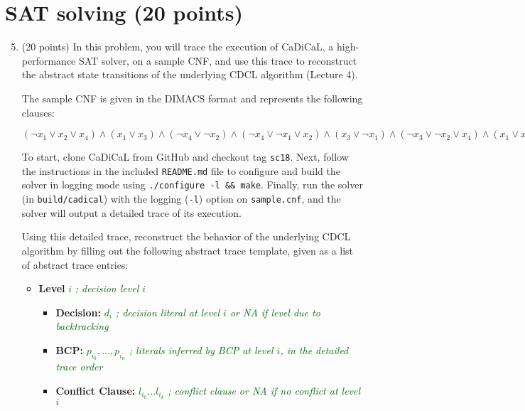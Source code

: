 \documentclass{article}
\begin{document}
\section{SAT solving (20 points)}\label{solving}


\begin{enumerate}
	\setcounter{enumi}{4}
	
	\item (20 points) In this problem, you will trace the execution of CaDiCaL, a high-performance SAT solver, on a sample CNF, and use this trace to reconstruct the abstract state transitions of the underlying CDCL algorithm (Lecture 4). 
	
	The sample CNF is given in the DIMACS format and represents the following clauses: 
	\begin{center}
		$(\neg x_1 \lor x_2 \lor x_4) \wedge (x_1 \lor x_3)  \wedge (\neg x_4 \lor \neg x_2) \wedge (\neg x_4 \lor \neg x_1 \lor x_2)  \wedge (x_3 \lor \neg x_1)  \wedge (\neg x_3 \lor \neg x_2 \lor x_4) \wedge (x_1 \lor x_4) \wedge (\neg x_2 \lor x_1)$
	\end{center}
	
	To start, clone CaDiCaL from GitHub and checkout tag \texttt{sc18}. Next, follow the instructions in the included \texttt{README.md} file to configure and build the solver in logging mode using \texttt{./configure -l \&\& make}. Finally, run the solver (in \texttt{build/cadical}) with the logging (\texttt{-l}) option on \texttt{sample.cnf}, and the solver will output a detailed trace of its execution. 
	
	Using this detailed trace, reconstruct the behavior of the underlying CDCL algorithm by filling out the following abstract trace template, given as a list of abstract trace entries:
	
	\begin{itemize}
		\item \textbf{Level} \textcolor{DarkGreen}{$i$}  \hfill{\textcolor{DarkGreen}{\emph{; decision level $i$}}}
		\begin{itemize}
			\item \textbf{Decision:} \textcolor{DarkGreen}{$d_i$}  \hfill{\textcolor{DarkGreen}{\emph{; decision literal at level $i$ or NA if level due to backtracking}}}
			\item \textbf{BCP:} \textcolor{DarkGreen}{$p_{i_0}, \ldots, p_{i_n}$} \hfill{\textcolor{DarkGreen}{\emph{; literals inferred by BCP at level $i$, in the detailed trace order}}}
			\item \textbf{Conflict Clause:}  \textcolor{DarkGreen}{$l_{i_0} \ldots l_{i_k}$} \hfill{\textcolor{DarkGreen}{\emph{; conflict clause or NA if no conflict at level $i$}}}
			

\end{itemize}
\end{itemize}
\end{enumerate}
\end{document}
